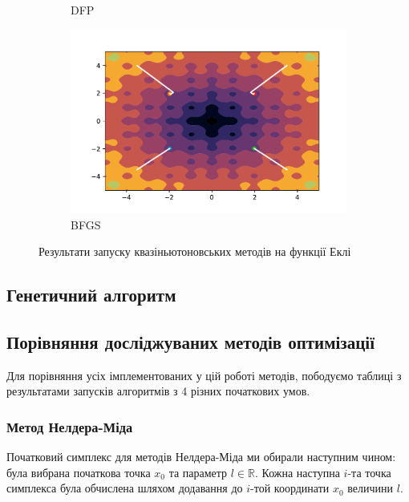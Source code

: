 \begin{figure}[h!]
\begin{subfigure}{0.5\textwidth}
        \caption{DFP}
    \end{subfigure}
    \begin{subfigure}{0.5\textwidth}
        \includegraphics[width=\textwidth, trim=1cm 0.5cm 1.3cm 1cm, clip]{assets/BFGS/ackley.pdf}
        \caption{BFGS}
    \end{subfigure}
    \caption{Результати запуску квазіньютоновських методів на функції Еклі}
\end{figure}

\pagebreak
\subsection*{Генетичний алгоритм}

\pagebreak
\subsection*{Порівняння досліджуваних методів оптимізації}
Для порівняння усіх імплементованих у цій роботі методів,
пободуємо таблиці з результатами запусків алгоритмів з 4
різних початкових умов.

\subsubsection*{Метод Нелдера-Міда}
Початковий симплекс для методів Нелдера-Міда ми обирали наступним чином:
була вибрана початкова точка $x_0$ та параметр $l \in \mathbb{R}$.
Кожна наступна $i$-та точка симплекса була обчислена шляхом додавання
до $i$-той координати $x_0$ величини $l$.

